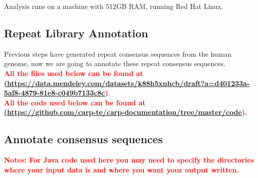 \documentclass[a4paper,12pt]{article}
\begin{document}
	Analysis runs on a machine with 512GB RAM, running Red Hat Linux.
	
	\pagebreak
	
	\subsection{Repeat Library Annotation}
	Previous steps have generated repeat consensus sequences from the human genome, now we are going to annotate these repeat consensus sequences. \\
	\textbf{\textcolor{red}{All the files used below can be found at \\
			\href{<url>}(\url{https://data.mendeley.com/datasets/k88h5xnhcb/draft?a=d401233a-5af8-4879-81e8-c049b7133c8c})}}. \\
	\textbf{\textcolor{red}{All the code used below can be found at \\ \href{<url>}(\url{https://github.com/carp-te/carp-documentation/tree/master/code})}.} 
	
	\subsection{Annotate consensus sequences}
	\textbf{\textcolor{red}{Notes: For Java code used here you may need to specify the directories where your input data is and where you want your output written. }}
	
\end{document}

